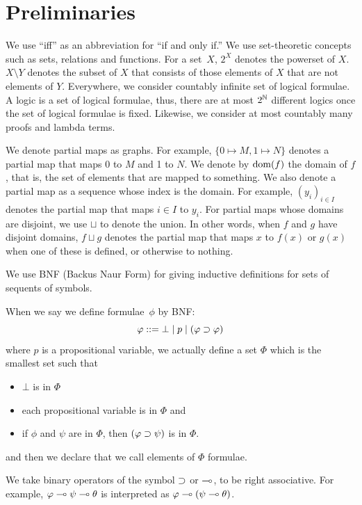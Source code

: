  \section{Preliminaries}

  We use ``iff'' as an abbreviation for ``if and only if.''
  We use set-theoretic concepts such as sets, relations and functions.
  For a set~$X$, $2^X$ denotes the powerset of $X$.
   $X\setminus Y$ denotes the subset of $X$ that consists of those
   elements of $X$ that are not elements of $Y$.
   Everywhere, we consider countably infinite set of logical formulae.
   A logic is a set of logical formulae, thus, there are at most
   ${2^{\mathbb N}}$ different logics once the set of logical
   formulae is fixed.
   Likewise, we consider at most countably many proofs and lambda terms.

   We denote partial maps as graphs.
   For example, $\{0\mapsto M, 1\mapsto N\}$ denotes a partial map that
   maps 0 to $M$ and 1 to $N$.
   We denote by $\mathop{\mathrm{dom}}(f)$ the domain of $f$, that is,
   the set of elements that are mapped to something.
   We also denote a partial map as a sequence whose index is the domain.
   For example, $(y_i)_{i\in I}$ denotes the partial map that maps
   $i\in I$ to $y_i$.
   For partial maps whose domains are disjoint, we use $\sqcup$ to
   denote the union.
   In other words, when $f$ and $g$ have disjoint domains, $f\sqcup g$
   denotes the
   partial map that maps $x$ to $f(x)$ or $g(x)$ when one of these is
   defined, or otherwise to nothing.

  We use BNF (Backus Naur Form) for giving inductive definitions for sets
  of sequents of symbols.
 \begin{example}
  When we say we define formulae~$\phi$ by BNF:
  \[
   \varphi::= \bot \mid p\mid (\varphi\supset\varphi)
  \]
  where $p$ is a propositional variable, we actually define a set $\Phi$
  which is the smallest set such that
  \begin{itemize}
   \item $\bot$ is in $\Phi$
   \item each propositional variable is in $\Phi$ and
   \item if $\phi$ and $\psi$ are in $\Phi$, then $(\varphi\supset\psi)$ is in $\Phi$.
  \end{itemize}
  and then we declare that we call elements of $\Phi$ formulae.
 \end{example}

 We take binary operators of the symbol $\supset$ or $\multimap$,
 to be right associative.  For example, $\varphi\multimap\psi\multimap\theta$
 is interpreted as $\varphi\multimap(\psi\multimap\theta)$.

